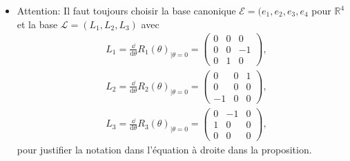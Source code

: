 \documentclass[10pt,a4paper]{article}
\theoremstyle{plain}
\theoremstyle{plain}
\theoremstyle{plain}
\theoremstyle{definition}
\theoremstyle{definition}
\theoremstyle{definition}
\theoremstyle{plain}
\newcommand{\R}{\mathbb{R}}
\newcommand{\dd}[1]{\mathrm{d}#1}
\begin{document}
\begin{itemize}
\item Attention: Il faut toujours choisir la base canonique $\mathcal{E} = (e_1, e_2,e_3, e_4$ pour $\R^4$ et la base $\mathcal{L} = (L_1, L_2, L_3)$ avec
\begin{align}
\label{eq: L1}
	&L_1 = \frac{\dd}{\dd\theta}R_1(\theta)_{\mid \theta =0} = \left(\begin{array}{ccc}
	0 & 0 & 0 \\ 
	0 & 0 & -1 \\ 
	0 & 1 & 0
	\end{array}  \right ),\\
\label{eq: L2}
	&L_2 = \frac{\dd}{\dd\theta}R_2(\theta)_{\mid \theta =0} = \left (\begin{array}{ccc}
	0 & 0 & 1 \\ 
	0 & 0 & 0 \\ 
	-1 & 0 & 0
	\end{array}  \right ),\\
\label{eq: L3}
	&L_3 = \frac{\dd}{\dd\theta}R_3(\theta)_{\mid \theta =0} = \left (\begin{array}{ccc}
	0 & -1 & 0 \\ 
	1 & 0 & 0 \\ 
	0 & 0 & 0
	\end{array}  \right ),
\end{align}
pour justifier la notation dans l'équation à droite dans la proposition.
\end{itemize}
\end{document}
